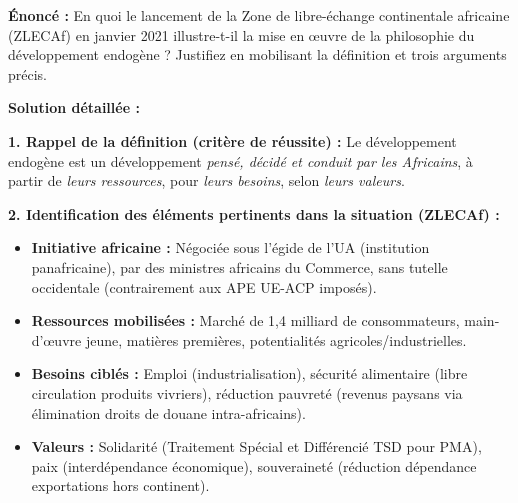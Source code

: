 \documentclass[11pt]{article}
\newcommand{\cle}[1]{{\popxbold\color{popdark}#1}}
\begin{document}
\begin{exoresolu}
\textbf{Énoncé :} En quoi le lancement de la Zone de libre-échange continentale africaine (ZLECAf) en janvier 2021 illustre-t-il la mise en œuvre de la philosophie du développement endogène ? Justifiez en mobilisant la définition et trois arguments précis.

\tcblower
\textbf{Solution détaillée :}

\textbf{1. Rappel de la définition (critère de réussite) :}
Le développement endogène est un développement \emph{pensé, décidé et conduit par les Africains}, à partir de \emph{leurs ressources}, pour \emph{leurs besoins}, selon \emph{leurs valeurs}.

\textbf{2. Identification des éléments pertinents dans la situation (ZLECAf) :}
\begin{itemize}
    \item \textbf{Initiative africaine :} Négociée sous l'égide de l'UA (institution panafricaine), par des ministres africains du Commerce, sans tutelle occidentale (contrairement aux APE UE-ACP imposés).
    \item \textbf{Ressources mobilisées :} Marché de 1,4 milliard de consommateurs, main-d'œuvre jeune, matières premières, potentialités agricoles/industrielles.
    \item \textbf{Besoins ciblés :} Emploi (industrialisation), sécurité alimentaire (libre circulation produits vivriers), réduction pauvreté (revenus paysans via élimination droits de douane intra-africains).
    \item \textbf{Valeurs :} Solidarité (Traitement Spécial et Différencié \cle{TSD} pour PMA), paix (interdépendance économique), souveraineté (réduction dépendance exportations hors continent).
\end{itemize}


\end{exoresolu}
\end{document}
